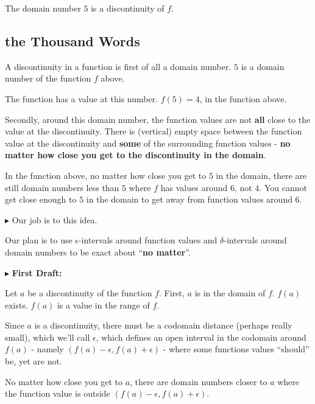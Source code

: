 \documentclass{ximera}
\begin{document}
The domain number $5$ is a discontinuity of $f$. 




\subsection*{the Thousand Words}


A discontinuity in a function is first of all a domain number.  $5$ is a domain number of the function $f$ above.


The function has a value at this number. $f(5) = 4$, in the function above.




Secondly, around this domain number, the function values are not \textbf{\textcolor{purple!85!blue}{all}} close to the value at the discontinuity. There is (vertical) empty space between the function value at the discontinuity and \textbf{\textcolor{purple!85!blue}{some}} of the surrounding function values - \textbf{\textcolor{red!70!black}{no matter how close you get to the discontinuity in the domain}}. 


In the function above, no matter how close you get to $5$ in the domain, there are still domain numbers less than $5$ where $f$ has values around $6$, not $4$. You cannot get close enough to $5$ in the domain to get away from function values around $6$.



\textbf{\textcolor{red!70!darkgray}{$\blacktriangleright$}} Our job is to  this idea. 


Our plan is to use $\epsilon$-intervals around function values and $\delta$-intervals around domain numbers to be exact about ``\textbf{no matter}''.




$\blacktriangleright$ \textbf{First Draft:}

Let $a$ be a discontinuity of the function $f$.  First, $a$ is in the domain of $f$. $f(a)$ exists.  $f(a)$ is a value in the range of $f$. 

Since $a$ is a discontinuity, there must be a codomain distance (perhaps really small), which we'll call $\epsilon$, which defines an open interval in the codomain around $f(a)$ - namely $(f(a)-\epsilon, f(a)+\epsilon)$ - where some functions values ``should'' be, yet are not.  


No matter how close you get to $a$, there are domain numbers closer to $a$ where the function value is outside $(f(a)-\epsilon, f(a)+\epsilon)$. 
\end{document}
